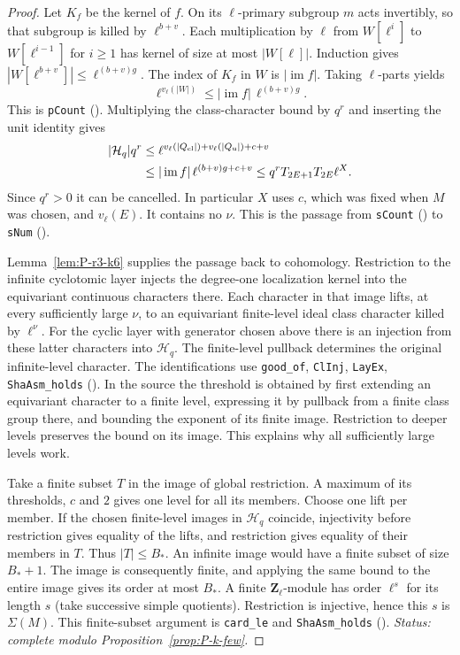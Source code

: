 \begin{proof}
Let $K_f$ be the kernel of $f$. On its $\ell$-primary subgroup $m$ acts
invertibly, so that subgroup is killed by $\ell^{b+v}$. Each multiplication
by $\ell$ from $W[\ell^i]$ to $W[\ell^{i-1}]$ for $i\ge1$ has kernel of size at
most $|W[\ell]|$. Induction gives $|W[\ell^{b+v}]|\le\ell^{(b+v)g}$.
The index of $K_f$ in $W$ is $|\operatorname{im} f|$. Taking $\ell$-parts
yields
\[
 \ell^{v_\ell(|W|)}\le|\operatorname{im}f|\,\ell^{(b+v)g}.
\]
This is \nolinkurl{pCount} ().
Multiplying the class-character bound by $q^r$ and inserting the unit
identity gives
\[
\begin{aligned}
 |\mathcal H_q|q^r
 &\le\ell^{v_\ell(|Q_{\rm cl}|)+v_\ell(|Q_{\rm u}|)+c+v}\\
 &\le |\operatorname{im}f|\,\ell^{(b+v)g+c+v}
 \le q^r T_{2E+1}T_{2E}\ell^X .
\end{aligned}
\]
Since $q^r>0$ it can be cancelled. In particular $X$ uses $c$, which was
fixed when $M$ was chosen, and $v_\ell(E)$. It contains no $\nu$.
This is the passage from \nolinkurl{sCount}
() to \nolinkurl{sNum}
().

Lemma~\ref{lem:P-r3-k6} supplies the passage back to cohomology. Restriction to the infinite
cyclotomic layer injects the degree-one localization kernel into the
equivariant continuous characters there. Each character in that image
lifts, at every sufficiently large $\nu$, to an equivariant finite-level
ideal class character killed by $\ell^\nu$. For the cyclic layer with
generator chosen above there is an injection from these latter characters
into $\mathcal H_q$. The finite-level pullback determines the original
infinite-level character. The identifications use
\nolinkurl{good_of}, \nolinkurl{ClInj}, \nolinkurl{LayEx},
\nolinkurl{ShaAsm_holds}
().
In the source the threshold is obtained by first extending an equivariant
character to a finite level, expressing it by pullback from a finite class
group there, and bounding the exponent of its finite image. Restriction
to deeper levels preserves the bound on its image. This explains why all
sufficiently large levels work.

Take a finite subset $T$ in the image of global restriction. A maximum
of its thresholds, $c$ and $2$ gives one level for all its members.
Choose one lift per member. If the chosen finite-level images in
$\mathcal H_q$ coincide, injectivity before restriction gives equality of
the lifts, and restriction gives equality of their members in $T$.
Thus $|T|\le B_*$. An infinite image would have a finite subset of size
$B_*+1$. The image is consequently finite, and applying the same bound
to the entire image gives its order at most $B_*$. A finite
$\mathbf Z_\ell$-module has order $\ell^s$ for its length $s$ (take
successive simple quotients). Restriction is injective, hence this $s$
is $\Sigma(M)$. This finite-subset argument is \nolinkurl{card_le} and
\nolinkurl{ShaAsm_holds} ().
\emph{Status: complete modulo Proposition~\ref{prop:P-k-few}.}
\end{proof}

